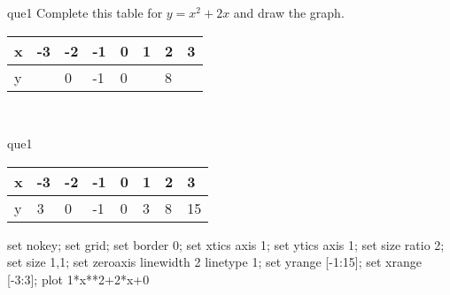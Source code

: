 \documentclass[13.5pt, varwidth=true]{beamer}
\begin{document}
\begin{frame}[shrink=19,fragile]
	\begin{beamercolorbox}[rounded=true, left, shadow=true,wd=14.8cm]{que1}
		 Complete this table for $y = x^{2} + 2x$ and draw the graph. \\[0.3cm] \renewcommand{\arraystretch}{1.2}\begin{tabular}{|C|C|C|C|C|C|C|C|} \hline x & -3 & -2 & -1 & 0 & 1 & 2 & 3 \\ \hline y &  & 0 & -1 & 0 &  & 8 & \\ \hline \end{tabular}\\[0.3cm]
	\end{beamercolorbox}
\end{frame}
\begin{frame}[shrink=19,fragile]
	\begin{beamercolorbox}[rounded=true, left, shadow=true,wd=14.8cm]{que1}
		\renewcommand{\arraystretch}{1.2}\begin{tabular}{|C|C|C|C|C|C|C|C|} \hline x & -3 & -2 & -1 & 0 & 1 & 2 & 3 \\ \hline y & 3 & 0 & -1 & 0 & 3 & 8 & 15\\ \hline \end{tabular}\begin{gnuplot}[terminal=pdf] set nokey; set grid; set border 0; set xtics axis 1; set ytics axis 1; set size ratio 2; set size 1,1; set zeroaxis linewidth 2 linetype 1; set yrange [-1:15]; set xrange [-3:3]; plot 1*x**2+2*x+0 \end{gnuplot}
	\end{beamercolorbox}
\end{frame}
\end{document}
